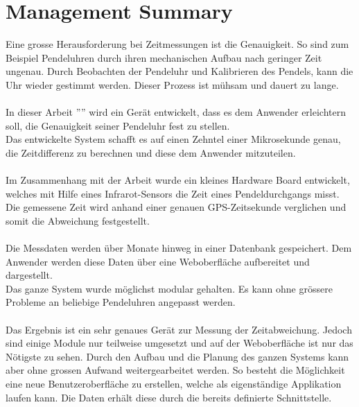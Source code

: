 \section{Management Summary}
Eine grosse Herausforderung bei Zeitmessungen ist die Genauigkeit. So sind zum Beispiel Pendeluhren durch ihren mechanischen Aufbau nach geringer Zeit ungenau. Durch Beobachten der Pendeluhr und Kalibrieren des Pendels, kann die Uhr wieder gestimmt werden. Dieser Prozess ist mühsam und dauert zu lange.\\
\\
In dieser Arbeit ''\documenttitle'' wird ein Gerät entwickelt, dass es dem Anwender erleichtern soll, die Genauigkeit seiner Pendeluhr fest zu stellen.\\
Das entwickelte System schafft es auf einen Zehntel einer Mikrosekunde genau, die Zeitdifferenz zu berechnen und diese dem Anwender mitzuteilen.\\
\\
Im Zusammenhang mit der Arbeit wurde ein kleines Hardware Board entwickelt, welches mit Hilfe eines Infrarot-Sensors die Zeit eines Pendeldurchgangs misst.\\
Die gemessene Zeit wird anhand einer genauen GPS-Zeitsekunde verglichen und somit die Abweichung festgestellt.\\
\\
Die Messdaten werden über Monate hinweg in einer Datenbank gespeichert.
Dem Anwender werden diese Daten über eine Weboberfläche aufbereitet und dargestellt.\\
Das ganze System wurde möglichst modular gehalten. Es kann ohne grössere Probleme an beliebige Pendeluhren angepasst werden.\\
\\
Das Ergebnis ist ein sehr genaues Gerät zur Messung der Zeitabweichung. 
Jedoch sind einige Module nur teilweise umgesetzt und auf der Weboberfläche ist nur das Nötigste zu sehen. 
Durch den Aufbau und die Planung des ganzen Systems kann aber ohne grossen Aufwand weitergearbeitet werden. 
So besteht die Möglichkeit eine neue Benutzeroberfläche zu erstellen, welche als eigenständige Applikation laufen kann. Die Daten erhält diese durch die bereits definierte Schnittstelle.

